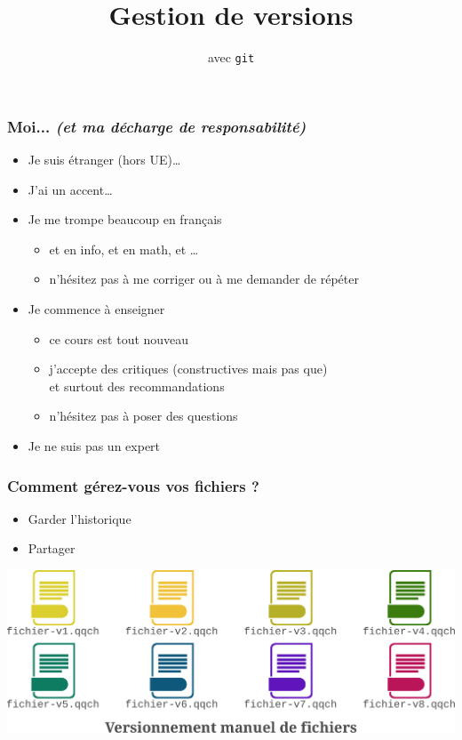 \documentclass[table,tikz,12pt,svgnames]{beamer}
\title{\LARGE Gestion de versions}
\subtitle{avec \texttt{git}}
\date{}
\begin{document}
\begin{frame}
	\titlepage
\end{frame}

\ifANIMATE
\begin{frame}
	\frametitle{Moi... \textit{\small (et ma décharge de responsabilité)}}
	\begin{itemize}
		\item Je suis étranger (hors UE)…
		\item J'ai un accent…
		\item Je me {\color{title} trompe beaucoup} en français
		\begin{itemize}
			\item et en info, et en math, et \ldots
			\item n'hésitez pas à me corriger ou à me demander de répéter
		\end{itemize}
		\item Je commence à enseigner
		\begin{itemize}
			\item ce cours est tout nouveau
			\item j'accepte des critiques (constructives mais pas que)\\
			et surtout des recommandations
			\item n'hésitez pas à poser des questions
		\end{itemize}
		\item Je ne suis pas un expert
	\end{itemize}
\end{frame}
\fi

\begin{frame}
	\frametitle{Comment gérez-vous vos fichiers ?}
	\vspace{-1em}
	\begin{block}{}
	\begin{itemize}
		\item Garder l'historique
		\item Partager
	\end{itemize}
	\end{block}
	\vspace{-2em}
	\PAUSE
	\begin{block}{}
    \begin{adjustwidth}{-0.5cm}{-0.5cm}{}
		\begin{center}	
		{\includegraphics[scale=0.5]{images/file_versions.pdf}}
		\end{center}
	\end{adjustwidth}
	\end{block}
\end{frame}
\end{document}
